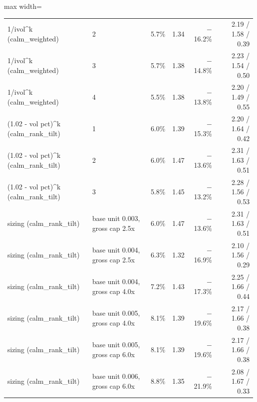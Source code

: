 {\begin{adjustbox}{max width=\linewidth}
\begin{tabular}{llrrrr}
1/ivol\^{}k (calm\_weighted) & 2 & 5.7\% & 1.34 & $-$16.2\% & 2.19 / 1.58 / 0.39 \\
1/ivol\^{}k (calm\_weighted) & 3 & 5.7\% & 1.38 & $-$14.8\% & 2.23 / 1.54 / 0.50 \\
1/ivol\^{}k (calm\_weighted) & 4 & 5.5\% & 1.38 & $-$13.8\% & 2.20 / 1.49 / 0.55 \\
\midrule
(1.02 - vol pct)\^{}k (calm\_rank\_tilt) & 1 & 6.0\% & 1.39 & $-$15.3\% & 2.20 / 1.64 / 0.42 \\
(1.02 - vol pct)\^{}k (calm\_rank\_tilt) & 2 & 6.0\% & 1.47 & $-$13.6\% & 2.31 / 1.63 / 0.51 \\
(1.02 - vol pct)\^{}k (calm\_rank\_tilt) & 3 & 5.8\% & 1.45 & $-$13.2\% & 2.28 / 1.56 / 0.53 \\
\midrule
sizing (calm\_rank\_tilt) & base unit 0.003, gross cap 2.5x & 6.0\% & 1.47 & $-$13.6\% & 2.31 / 1.63 / 0.51 \\
sizing (calm\_rank\_tilt) & base unit 0.004, gross cap 2.5x & 6.3\% & 1.32 & $-$16.9\% & 2.10 / 1.56 / 0.29 \\
sizing (calm\_rank\_tilt) & base unit 0.004, gross cap 4.0x & 7.2\% & 1.43 & $-$17.3\% & 2.25 / 1.66 / 0.44 \\
sizing (calm\_rank\_tilt) & base unit 0.005, gross cap 4.0x & 8.1\% & 1.39 & $-$19.6\% & 2.17 / 1.66 / 0.38 \\
sizing (calm\_rank\_tilt) & base unit 0.005, gross cap 6.0x & 8.1\% & 1.39 & $-$19.6\% & 2.17 / 1.66 / 0.38 \\
sizing (calm\_rank\_tilt) & base unit 0.006, gross cap 6.0x & 8.8\% & 1.35 & $-$21.9\% & 2.08 / 1.67 / 0.33 \\
\bottomrule
\end{tabular}
\end{adjustbox}
}

